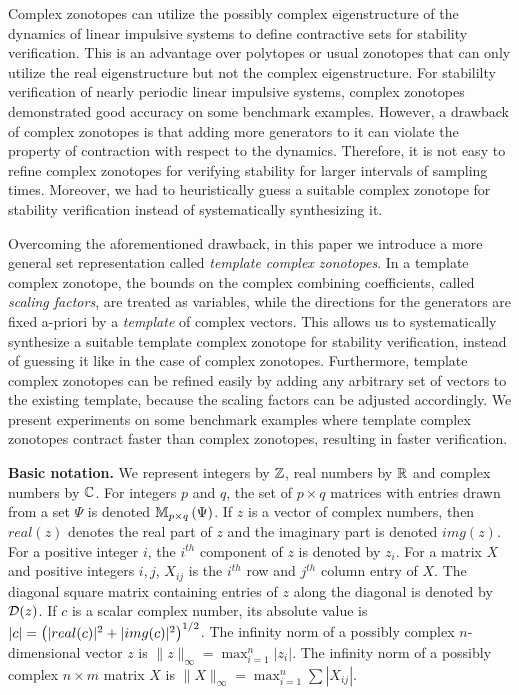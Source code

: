 Complex zonotopes can utilize the possibly complex eigenstructure
of the dynamics of linear impulsive systems to define
contractive sets for stability verification.  This is an advantage
over polytopes or usual zonotopes that can only utilize the real
eigenstructure but not the complex eigenstructure.  For stabililty
verification of nearly periodic linear impulsive systems, complex
zonotopes demonstrated good accuracy on some benchmark examples.
However, a drawback of complex zonotopes is that adding more
generators to it can violate the property of contraction with respect
to the dynamics.  Therefore, it is not easy to refine complex
zonotopes for verifying stability for larger intervals of sampling
times.  Moreover, we had to heuristically guess a suitable complex
zonotope for stability verification instead of systematically
synthesizing it.

Overcoming the aforementioned drawback, in this paper we introduce a
more general set representation called \emph{template complex
zonotopes}.  In a {template complex zonotope}, the bounds on the
complex combining coefficients, called \emph{scaling factors}, are
treated as variables, while the directions for the generators are
fixed a-priori by a \emph{template} of complex vectors.  This allows
us to systematically synthesize a suitable template complex zonotope
for stability verification, instead of guessing it like in the case of
complex zonotopes.  Furthermore, template complex zonotopes can be
refined easily by adding any arbitrary set of vectors to the existing
template, because the scaling factors can be adjusted accordingly.  We
present experiments on some benchmark examples where template complex
zonotopes contract faster than complex zonotopes, resulting in faster
verification.

{\bf Basic notation.} We represent integers by $\mathbb{Z}$, real numbers
by $\mathbb{R}$ and complex numbers by $\mathbb{C}$.  For integers $p$ and
$q$, the set of $p\times q$ matrices with entries drawn from a set
$\Psi$ is denoted $\mathbb{M}_{p\times q}\left(\Psi\right)$.  If $z$ is a vector of complex
numbers, then $real(z)$ denotes the real part of $z$ and the imaginary
part is denoted $img(z)$.  For a positive integer $i$, the $i^{th}$
component of $z$ is denoted by $z_i$.  For a matrix $X$ and positive
integers $i, j$, $X_{ij}$ is the $i^{th}$ row and $j^{th}$ column
entry of $X$. The diagonal square matrix containing entries of $z$
along the diagonal is denoted by $\mathcal{D}(z)$.  If $c$ is a scalar complex
number, its absolute value is
$|c|=\left(|real(c)|^2+|img(c)|^2\right)^{1/2}$.  The infinity norm of a
possibly complex $n$-dimensional vector $z$ is
$\|z\|_{\infty}=\max_{i=1}^n{|z_i|}$. The infinity norm of a possibly
complex $n\times m$ matrix $X$ is $\|X\|_\infty=\max_{i=1}^{n}\sum{|X_{ij}|}$.

